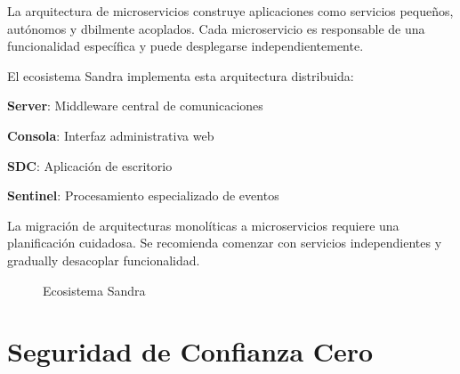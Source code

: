 La arquitectura de microservicios construye aplicaciones como servicios peque\~nos, aut\'onomos y dbilmente acoplados. Cada microservicio es responsable de una funcionalidad espec\'ifica y puede desplegarse independientemente.

\begin{cajaInfo}
El ecosistema Sandra implementa esta arquitectura distribuida:
\end{cajaInfo}

\begin{listaTecnologias}
    \item \textbf{Server}: Middleware central de comunicaciones
    \item \textbf{Consola}: Interfaz administrativa web
    \item \textbf{SDC}: Aplicaci\'on de escritorio
    \item \textbf{Sentinel}: Procesamiento especializado de eventos
\end{listaTecnologias}

\begin{cajaAdvertencia}
    La migraci\'on de arquitecturas monol\'iticas a microservicios requiere una planificaci\'on cuidadosa. Se recomienda comenzar con servicios independientes y gradually desacoplar funcionalidad.
\end{cajaAdvertencia}

\begin{figure}
    \centering
    \caption{Ecosistema Sandra}
    \label{fig:sandra-ecosystem}
\end{figure}

\section{Seguridad de Confianza Cero}

